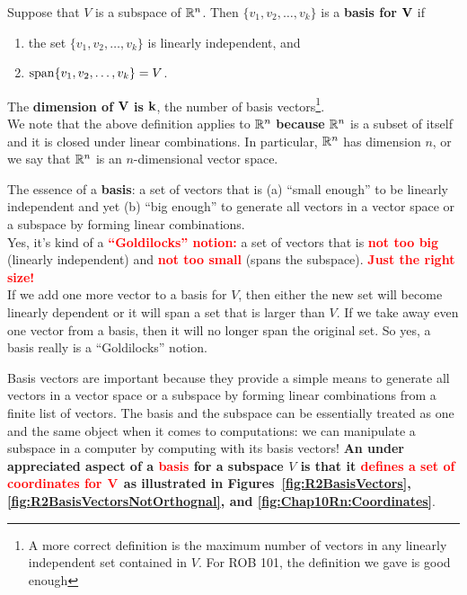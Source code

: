 
\begin{tcolorbox}[sharp corners, colback=green!30, colframe=green!80!blue, title=\textbf{\Large Basis Vectors and Dimension}]
Suppose that $V$ is a subspace of $\mathbb R^n$. Then $\{ v_1, v_2, \ldots, v_k\}$ is a \textbf{basis for} ${\bf V}$ if
\begin{enumerate}
    \item the set $\{ v_1, v_2, \ldots, v_k\}$ is linearly independent, and 
    \item $\mathrm{span} \{ v_1,  v_2,\ldots, v_k \}=V$.
\end{enumerate}

The \textbf{dimension of} ${\bf V}$ \textbf{is} ${\bf k}$, the number of basis vectors\footnote{A more correct definition is the maximum number of vectors in any linearly independent set contained in $V$. For ROB 101, the definition we gave is good enough}.\\

We note that the above definition applies to $\mathbb R^n$ \textbf{because} $\mathbb R^n$ is a subset of itself and it is closed under linear combinations. In particular, $\mathbb R^n$ has dimension $n$, or we say that $\mathbb R^n$ is an $n$-dimensional vector space.
\end{tcolorbox}

\begin{tcolorbox}[title=\textcolor{red}{\bf \Large Basis Intuition}]
The essence of a \textbf{basis}: a set of vectors that is (a) ``small enough'' to be linearly independent and yet (b) ``big enough'' to generate all vectors in a vector space or a subspace by forming linear combinations.\\

Yes, it's kind of a \textcolor{red}{\bf ``Goldilocks'' notion:} a set of vectors that is \textcolor{red}{\bf not too big} (linearly independent) and \textcolor{red}{\bf not too small} (spans the subspace). \textcolor{red}{\bf Just the right size! }\\

If we add one more vector to a basis for $V$, then either the new set will become linearly dependent or it will span a set that is larger than $V$. If we take away even one vector from a basis, then it will no longer span the original set. So yes, a basis really is a ``Goldilocks'' notion.
\end{tcolorbox}
\vspace*{.1cm}
Basis vectors are important because they provide a simple means to generate all vectors in a vector space or a subspace by forming linear combinations from a finite list of vectors. The basis and the subspace can be essentially treated as one and the same object when it comes to computations: we can manipulate a subspace in a computer by computing with its basis vectors! \textbf{An under appreciated aspect of a \textcolor{red}{basis}   for a subspace $V$ is that it  \textcolor{red}{defines a set of coordinates for} ${\textcolor{red}{\bf V}}$ as illustrated in Figures~\ref{fig:R2BasisVectors}, \ref{fig:R2BasisVectorsNotOrthognal}, and \ref{fig:Chap10Rn:Coordinates}}. 





